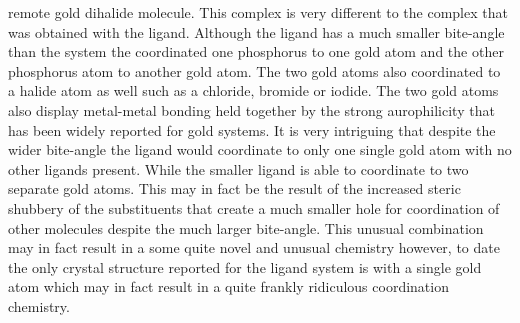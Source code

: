 remote gold dihalide molecule.  This complex is very different to the complex that was obtained with the \Phxantphos{} ligand.  Although the \Phxantphos{} ligand has a much smaller bite-angle than the \tBuxantphos{} system the \Phxantphos{} coordinated one phosphorus to one gold atom and the other phosphorus atom to another gold atom.  The two gold atoms also coordinated to a halide atom as well such as a chloride, bromide or iodide.  The two gold atoms also display metal-metal bonding held together by the strong aurophilicity that has been widely reported for gold systems.  It is very intriguing that despite the wider bite-angle the \tBuxantphos ligand would coordinate to only one single gold atom with no other ligands present.  While the smaller \Phxantphos ligand is able to coordinate to two separate gold atoms.  This may in fact be the result of the increased steric shubbery of the \tBu substituents that create a much smaller hole for coordination of other molecules despite the much larger bite-angle.  This unusual combination may in fact result in a some quite novel and unusual chemistry however, to date the only crystal structure reported for the \tBuxantphos{} ligand system is with a single gold atom which may in fact result in a quite frankly ridiculous coordination chemistry.  
%
%
